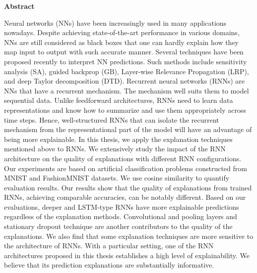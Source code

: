\thispagestyle{empty}
\vspace*{1.0cm}

\begin{center}
    \textbf{Abstract}
\end{center}

\vspace*{0.5cm}

\noindent

Neural networks (NNs) have been increasingly used in many applications nowadays. Despite achieving state-of-the-art performance in various domains, NNs are still considered as black boxes that one can hardly explain how they map input to output with such accurate manner.  Several techniques have been proposed recently to interpret NN predictions. Such methods include sensitivity analysis (SA), guided backprop (GB), Layer-wise Relevance Propagation (LRP), and deep Taylor decomposition (DTD).  Recurrent neural networks (RNNs) are NNs that have a recurrent mechanism. The mechanism well suits them to model sequential data.  Unlike feedforward architectures, RNNs need to learn data representations and know how to summarize and use them appropriately across time steps. Hence, well-structured RNNs that can isolate the recurrent mechanism from the representational part of the model will have an advantage of being more explainable. In this thesis, we apply the explanation techniques mentioned above to RNNs. We extensively study the impact of the RNN architecture on the quality of explanations with different RNN configurations. Our experiments are based on artificial classification problems constructed from MNIST and FashionMNIST datasets. We use cosine similarity to quantify evaluation results. Our results show that the quality of explanations from trained RNNs, achieving comparable accuracies, can be notably different. Based on our evaluations, deeper and LSTM-type RNNs have more explainable predictions regardless of the explanation methods.  Convolutional and pooling layers and stationary dropout technique are another contributors to the quality of the explanations. We also find that some explanation techniques are more sensitive to the architecture of RNNs. With a particular setting, one of the RNN architectures proposed in this thesis establishes a high level of explainability. We believe that its prediction explanations are substantially informative.

